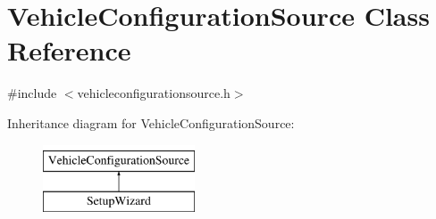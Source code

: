 \hypertarget{class_vehicle_configuration_source}{\section{Vehicle\-Configuration\-Source Class Reference}
\label{class_vehicle_configuration_source}
}


{\ttfamily \#include $<$vehicleconfigurationsource.\-h$>$}

Inheritance diagram for Vehicle\-Configuration\-Source\-:\begin{figure}[H]
\begin{center}
\leavevmode
\includegraphics[height=2.000000cm]{class_vehicle_configuration_source}
\end{center}
\end{figure}
